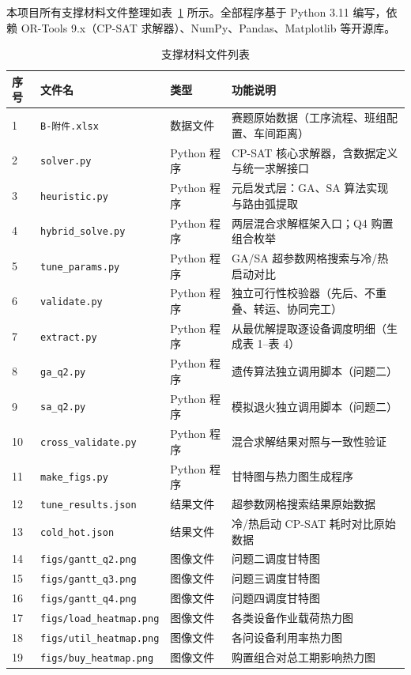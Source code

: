 \documentclass[12pt,a4paper]{ctexart}
\begin{document}
本项目所有支撑材料文件整理如表~\ref{tab:filelist} 所示。全部程序基于 Python 3.11 编写，依赖 OR-Tools 9.x（CP-SAT 求解器）、NumPy、Pandas、Matplotlib 等开源库。

\begin{table}[H]
\centering
\caption{支撑材料文件列表}\label{tab:filelist}
\small
\begin{tabular}{p{0.8cm} p{4.5cm} p{2.5cm} p{6.2cm}}
\toprule
\textbf{序号} & \textbf{文件名} & \textbf{类型} & \textbf{功能说明} \\
\midrule
1 & \texttt{B-附件.xlsx} & 数据文件 & 赛题原始数据（工序流程、班组配置、车间距离） \\
2 & \texttt{solver.py} & Python 程序 & CP-SAT 核心求解器，含数据定义与统一求解接口 \\
3 & \texttt{heuristic.py} & Python 程序 & 元启发式层：GA、SA 算法实现与路由弧提取 \\
4 & \texttt{hybrid\_solve.py} & Python 程序 & 两层混合求解框架入口；Q4 购置组合枚举 \\
5 & \texttt{tune\_params.py} & Python 程序 & GA/SA 超参数网格搜索与冷/热启动对比 \\
6 & \texttt{validate.py} & Python 程序 & 独立可行性校验器（先后、不重叠、转运、协同完工） \\
7 & \texttt{extract.py} & Python 程序 & 从最优解提取逐设备调度明细（生成表 1--表 4） \\
8 & \texttt{ga\_q2.py} & Python 程序 & 遗传算法独立调用脚本（问题二） \\
9 & \texttt{sa\_q2.py} & Python 程序 & 模拟退火独立调用脚本（问题二） \\
10 & \texttt{cross\_validate.py} & Python 程序 & 混合求解结果对照与一致性验证 \\
11 & \texttt{make\_figs.py} & Python 程序 & 甘特图与热力图生成程序 \\
12 & \texttt{tune\_results.json} & 结果文件 & 超参数网格搜索结果原始数据 \\
13 & \texttt{cold\_hot.json} & 结果文件 & 冷/热启动 CP-SAT 耗时对比原始数据 \\
14 & \texttt{figs/gantt\_q2.png} & 图像文件 & 问题二调度甘特图 \\
15 & \texttt{figs/gantt\_q3.png} & 图像文件 & 问题三调度甘特图 \\
16 & \texttt{figs/gantt\_q4.png} & 图像文件 & 问题四调度甘特图 \\
17 & \texttt{figs/load\_heatmap.png} & 图像文件 & 各类设备作业载荷热力图 \\
18 & \texttt{figs/util\_heatmap.png} & 图像文件 & 各问设备利用率热力图 \\
19 & \texttt{figs/buy\_heatmap.png} & 图像文件 & 购置组合对总工期影响热力图 \\
\bottomrule
\end{tabular}
\end{table}
\end{document}
